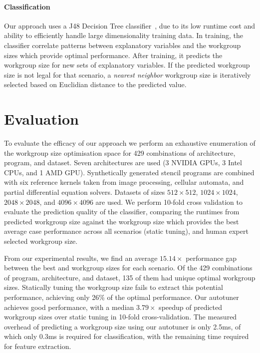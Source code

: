 \documentclass[hidelinks]{acaces}
\begin{document}
\paragraph{Classification} Our approach uses a J48 Decision Tree
classifier~\cite{Han2011}, due to its low runtime cost and ability to
efficiently handle large dimensionality training data. In training,
the classifier correlate patterns between explanatory variables and
the workgroup sizes which provide optimal performance. After training,
it predicts the workgroup size for new sets of explanatory
variables. If the predicted workgroup size is not legal for that
scenario, a \emph{nearest neighbor} workgroup size is iteratively
selected based on Euclidian distance to the predicted value.

\section{Evaluation}

To evaluate the efficacy of our approach we perform an exhaustive
enumeration of the workgroup size optimisation space for 429
combinations of architecture, program, and dataset. Seven
architectures are used (3 NVIDIA GPUs, 3 Intel CPUs, and 1 AMD
GPU). Synthetically generated stencil programs are combined with six
reference kernels taken from image processing, cellular automata, and
partial differential equation solvers. Datasets of sizes
$512\times512$, $1024\times1024$, $2048\times2048$, and
$4096\times4096$ are used. We perform 10-fold cross validation to
evaluate the prediction quality of the classifier, comparing the
runtimes from predicted workgroup size against the workgroup size
which provides the best average case performance across all scenarios
(static tuning), and human expert selected workgroup size.


From our experimental results, we find an average $15.14\times$
performance gap between the best and workgroup sizes for each
scenario. Of the 429 combinations of program, architecture, and
dataset, 135 of them had unique optimal workgroup sizes. Statically
tuning the workgroup size fails to extract this potential performance,
achieving only 26\% of the optimal performance. Our autotuner achieves
good performance, with a median $3.79\times$ speedup of predicted
workgroup sizes over static tuning in 10-fold cross-validation. The
measured overhead of predicting a workgroup size using our autotuner
is only 2.5ms, of which only 0.3ms is required for classification,
with the remaining time required for feature extraction.
\end{document}
